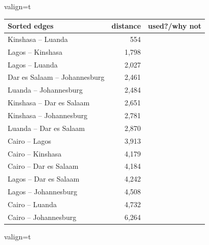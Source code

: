 \documentclass[12pt]{article}
\begin{document}
\begin{enumerate}
\begin{adjustbox}{valign=t}
\begin{tabular}{ l | r | r }
Sorted edges & distance & used?/why not \\ \hline
Kinshasa -- Luanda & 554 & \\ \hline
Lagos -- Kinshasa & 1{,}798 & \\ \hline
Lagos -- Luanda & 2{,}027 & \\ \hline
Dar es Salaam -- Johannesburg & 2{,}461 & \\ \hline
Luanda -- Johannesburg & 2{,}484 & \\ \hline
Kinshasa -- Dar es Salaam & 2{,}651 & \\ \hline
Kinshasa -- Johannesburg & 2{,}781 & \\ \hline
Luanda -- Dar es Salaam & 2{,}870 & \\ \hline
Cairo -- Lagos & 3{,}913 & \\ \hline
Cairo -- Kinshasa & 4{,}179 & \\ \hline
Cairo -- Dar es Salaam & 4{,}184 & \\ \hline
Lagos -- Dar es Salaam & 4{,}242 & \\ \hline
Lagos -- Johannesburg & 4{,}508 & \\ \hline
Cairo -- Luanda & 4{,}732 & \\ \hline
Cairo -- Johannesburg & 6{,}264 & \\ \hline
\end{tabular}
\end{adjustbox}
\hfill
\begin{adjustbox}{valign=t}
\end{adjustbox}
\end{enumerate}
\end{document}

